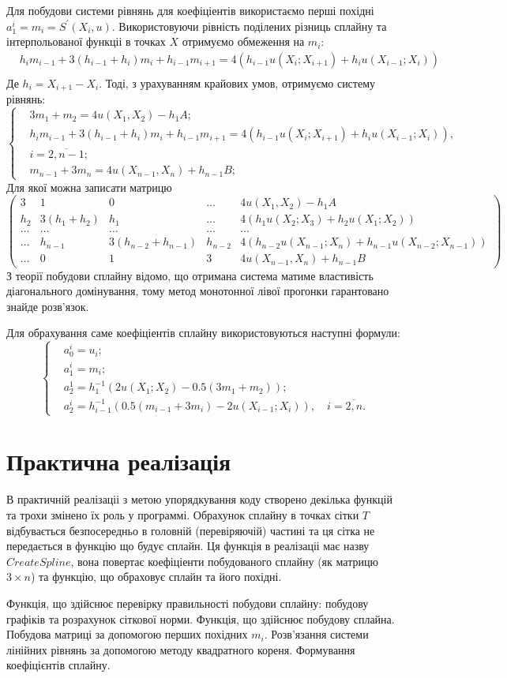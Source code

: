 \documentclass[titlepage]{article}
\newcommand\makelisting[1]{\begingroup\spacing{1} \vspace{1cm} \endgroup}
\newcommand\mysection[1]{\begingroup\center\section*{#1}\endgroup}
\newcommand\eq[1]{\begin{equation*}\begin{split}#1\end{split}\end{equation*}}
\newcommand\eqc[1]{\begin{equation*}\begin{cases}#1\end{cases}\end{equation*}}
\begin{document}
Для побудови системи рівнянь для коефіціентів використаємо перші похідні $a_1^i = m_i = S^{'}(X_i, u)$. Використовуючи рівність поділених різниць сплайну та інтерпольованої функціі в точках $X$ отримуємо обмеження на $m_i$:
\eq{
&h_im_{i-1} + 3(h_{i-1} + h_i)m_i + h_{i-1}m_{i+1} = 4(h_{i-1}u(X_i; X_{i+1}) + h_iu(X_{i-1}; X_i))\\
}
Де $h_i = X_{i+1} - X_i$. Тоді, з урахуванням крайових умов, отримуємо систему рівнянь:
\eqc{
&3m_1 + m_2 = 4u(X_1, X_2)-h_1A;\\
&h_im_{i-1} + 3(h_{i-1} + h_i)m_i + h_{i-1}m_{i+1} = 4(h_{i-1}u(X_i; X_{i+1}) + h_iu(X_{i-1}; X_i)),\\
& i = \overline{2,n-1};\\
&m_{n-1} + 3m_n = 4u(X_{n-1}, X_n) + h_{n-1}B;
}
Для якої можна записати матрицю
\[\left(\begin{array}{cccc|c}
3 & 1 & 0 & \ldots  & 4u(X_1, X_2)-h_1A\\
h_2 & 3(h_1 + h_2) & h_1 & \ldots & 4(h_{1}u(X_2; X_{3}) + h_2u(X_{1}; X_2)) \\
\ldots &\ldots &\ldots &\ldots & \ldots\\
\ldots &h_{n-1} & 3(h_{n-2} + h_{n- 1}) & h_{n-2} & 4(h_{n-2}u(X_{n-1}; X_{n}) + h_{n-1}u(X_{n-2}; X_{n-1}))\\
 \ldots & 0  & 1 & 3 & 4u(X_{n-1}, X_n) + h_{n-1}B
\end{array}\right)\]
З теорії побудови сплайну відомо, що отримана система матиме властивість діагонального домінування, тому метод монотонної лівої прогонки гарантовано знайде розв'язок.

Для обрахування саме коефіціентів сплайну використовуються наступні формули:
\eqc{
&a_0^i = u_i;\\
&a_1^i = m_i;\\
&a_2^1 = h_1^{-1}(2u(X_1;X_2) - 0.5(3m_1+m_2));\\
&a_2^i = h_{i-1}^{-1}(0.5(m_{i-1}+3m_i) - 2u(X_{i-1}; X_i)), \quad i=\overline{2,n}.
}
\mysection{Практична реалізація}
В практичній реалізаціі з метою упорядкування коду створено декілька функцій та трохи змінено їх роль у программі. Обрахунок сплайну в точках сітки $T$ відбувається безпосередньо в головній (перевіряючій) частині та ця сітка не передається в функцію що будує сплайн. Ця функція в реалізаціі має назву $CreateSpline$, вона повертає коефіціенти побудованого сплайну (як матрицю $3\times n$) та функцію, що обраховує сплайн та його похідні. 

Функція, що здійснює перевірку правильності побудови сплайну: побудову графіків та розрахунок сіткової норми.
\makelisting{main.m}
Функція, що здійснює побудову сплайна.
\makelisting{CreateSpline.m}
Побудова матриці за допомогою перших похідних $m_i$.
\makelisting{CreateSEMatrix.m}
Розв'язання системи лінійних рівнянь за допомогою методу квадратного кореня.
\makelisting{SolveSE.m}
Формування коефіцієнтів сплайну.
\makelisting{FormSpline.m}
\end{document}
